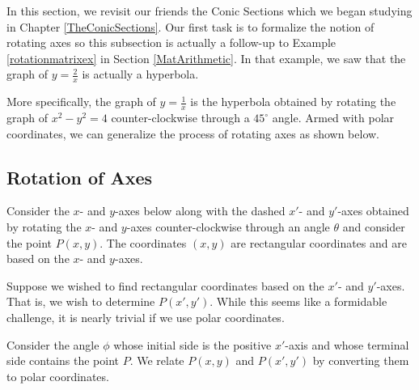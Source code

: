 

\setcounter{footnote}{0}

\label{PolarConics}

In this section, we revisit our friends the Conic Sections which we began studying in Chapter \ref{TheConicSections}.  Our first task is to formalize the notion of rotating axes so this subsection is actually a follow-up to Example  \ref{rotationmatrixex} in Section \ref{MatArithmetic}. In that example, we saw that the graph of $y = \frac{2}{x}$ is actually a hyperbola.  

\smallskip

More specifically, the graph of $y = \frac{1}{x}$ is the hyperbola  obtained by rotating the graph of $x^2-y^2=4$ counter-clockwise through a $45^{\circ}$ angle.  Armed with polar coordinates, we can generalize the process of rotating axes as shown below.


\subsection{Rotation of Axes}
\label{rotationaxes}

Consider the $x$- and $y$-axes below along with the dashed $x'$- and $y'$-axes obtained by rotating the $x$- and $y$-axes counter-clockwise through an angle $\theta$ and consider the point $P(x,y)$.  The coordinates $(x,y)$ are rectangular coordinates and are based on the $x$- and $y$-axes.  

\smallskip

Suppose we wished to find rectangular coordinates based on the $x'$- and $y'$-axes.  That is, we wish to determine $P(x',y')$.  While this seems like a formidable challenge, it is nearly trivial if we use polar coordinates.  

\smallskip

Consider the angle $\phi$ whose initial side is the positive $x'$-axis and whose terminal side contains the point $P$.   We relate $P(x,y)$ and $P(x',y')$ by converting them to polar coordinates. 

